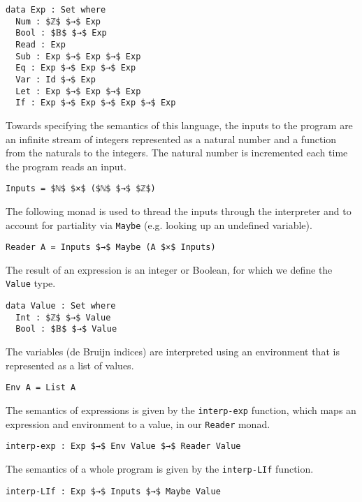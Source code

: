 \documentclass[sigplan,screen]{acmart}
\begin{document}
\begin{lstlisting}
data Exp : Set where
  Num : $ℤ$ $→$ Exp
  Bool : $𝔹$ $→$ Exp
  Read : Exp
  Sub : Exp $→$ Exp $→$ Exp
  Eq : Exp $→$ Exp $→$ Exp
  Var : Id $→$ Exp
  Let : Exp $→$ Exp $→$ Exp
  If : Exp $→$ Exp $→$ Exp $→$ Exp
\end{lstlisting}

Towards specifying the semantics of this language, the inputs to the
program are an infinite stream of integers represented as a natural
number and a function from the naturals to the integers.  The natural
number is incremented each time the program reads an input.

\begin{lstlisting}
Inputs = $ℕ$ $×$ ($ℕ$ $→$ $ℤ$)
\end{lstlisting}

The following monad is used to thread the inputs through the
interpreter and to account for partiality via \lstinline{Maybe}
(e.g. looking up an undefined variable).

\begin{lstlisting}
Reader A = Inputs $→$ Maybe (A $×$ Inputs)
\end{lstlisting}

\noindent The result of an expression is an integer or Boolean, for which we
define the \lstinline{Value} type.

\begin{lstlisting}
data Value : Set where
  Int : $ℤ$ $→$ Value
  Bool : $𝔹$ $→$ Value
\end{lstlisting}

\noindent The variables (de Bruijn indices) are interpreted using an
environment that is represented as a list of values.

\begin{lstlisting}
Env A = List A
\end{lstlisting}

\noindent The semantics of expressions is given by the
\lstinline{interp-exp} function, which maps an expression and
environment to a value, in our \lstinline{Reader} monad.

\begin{lstlisting}
interp-exp : Exp $→$ Env Value $→$ Reader Value
\end{lstlisting}

\noindent The semantics of a whole program is given by the
\lstinline{interp-LIf} function.

\begin{lstlisting}
interp-LIf : Exp $→$ Inputs $→$ Maybe Value
\end{lstlisting}
\end{document}
